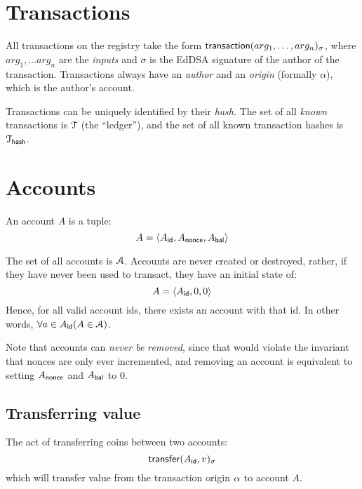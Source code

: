 \section{Transactions}
\label{s:transactions}

All transactions on the registry take the form $\operatorname{\mathsf{transaction}}\lparen arg_1, \ldots,
arg_n\rparen_\sigma$, where $arg_1, \ldots arg_n$ are the \emph{inputs} and $\sigma$ is the
\textsf{EdDSA} signature of the author of the transaction. Transactions always
have an \emph{author} and an \emph{origin} (formally $\alpha$), which is the
author's account.

Transactions can be uniquely identified by their \emph{hash}. The set of all
\emph{known} transactions is $\mathcal{T}$ (the ``ledger''), and the set of all known
transaction hashes is $\mathcal{T}_{\mathsf{hash}}$.

\section{Accounts}
An account $A$ is a tuple:
\[
    A = \langle A_{\mathsf{id}}, A_{\mathsf{nonce}}, A_{\mathsf{bal}}\rangle
\]

The set of all accounts is $\mathcal{A}$. Accounts are never created or destroyed,
rather, if they have never been used to transact, they have an initial state of:
\[
    A = \langle A_{\mathsf{id}}, 0, 0\rangle
\]
Hence, for all valid account ids, there exists an account with that id. In other
words, $\forall a \in A_{\mathsf{id}} (A \in \mathcal{A})$.

Note that accounts can \emph{never be removed}, since that would violate the
invariant that nonces are only ever incremented, and removing an account is
equivalent to setting $A_{\mathsf{nonce}}$ and $A_{\mathsf{bal}}$ to $0$.

\subsection{Transferring value}
The act of transferring coins between two accounts:
\[
    \operatorname{\mathsf{transfer}}\lparen A_{\mathsf{id}}, v\rparen_\sigma
\]
which will transfer value from the transaction origin $\alpha$ to account $A$.

